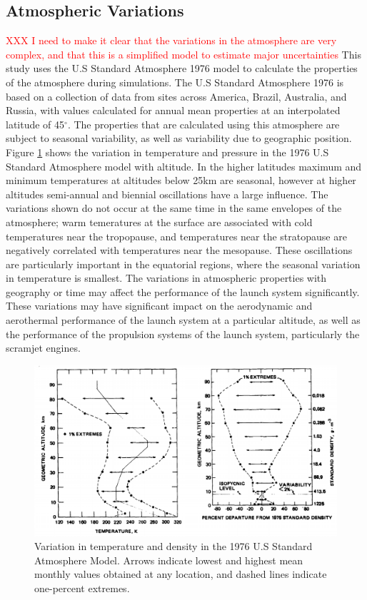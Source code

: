 \subsection{Atmospheric Variations}
\textcolor{red}{XXX I need to make it clear that the variations in the atmosphere are very complex, and that this is a simplified model to estimate major uncertainties}
This study uses the U.S Standard Atmosphere 1976 model\cite{Administration1976} to calculate the properties of the atmosphere during simulations. The U.S Standard Atmosphere 1976 is based on a collection of data from sites across America, Brazil, Australia, and Russia, with values calculated for annual mean properties at an interpolated latitude of 45$^\circ$\cite{Administration1976}. The properties that are calculated using this atmosphere are subject to seasonal variability, as well as variability due to geographic position. Figure \ref{fig:AtmosphericVariation} shows the variation in temperature and pressure in the 1976 U.S Standard Atmosphere model with altitude. In the higher latitudes maximum and minimum temperatures at altitudes below 25km are seasonal, however at higher altitudes semi-annual and biennial oscillations have a large influence\cite{Administration1976}. The variations shown do not occur at the same time in the same envelopes of the atmosphere; warm temeratures at the surface are associated with cold temperatures near the tropopause, and temperatures near the stratopause are negatively correlated with temperatures near the mesopause\cite{Administration1976}. These oscillations are particularly important in the equatorial regions, where the seasonal variation in temperature is smallest. The variations in atmospheric properties with geography or time may affect the performance of the launch system significantly. These variations may have significant impact on the aerodynamic and aerothermal performance of the launch system at a particular altitude, as well as the performance of the propulsion systems of the launch system, particularly the scramjet engines. 

\begin{figure}[ht]
	\centering
	\includegraphics[width=0.8\linewidth]{figures/A1_uncertainty-analysis/AtmosphericVariation}
	\caption{Variation in temperature and density in the 1976 U.S Standard Atmosphere Model\cite{Administration1976}. Arrows indicate lowest and highest mean monthly values obtained at any location, and dashed lines indicate one-percent extremes.}
	\label{fig:AtmosphericVariation}
\end{figure}

